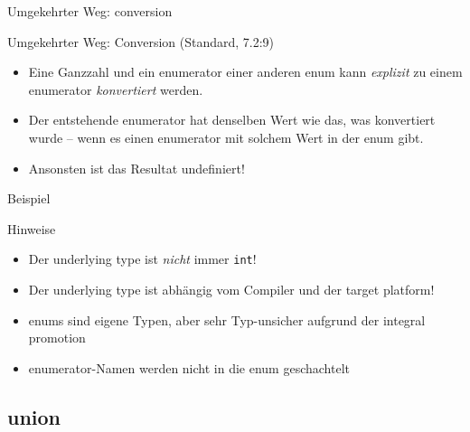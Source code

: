 \begin{frame}{Umgekehrter Weg: conversion}
	\begin{block}{Umgekehrter Weg: Conversion (Standard, 7.2:9)}
		\begin{itemize}[<+->]
			\item Eine Ganzzahl und ein enumerator einer anderen enum kann \emph{explizit} zu einem enumerator \emph{konvertiert} werden.
			\item Der entstehende enumerator hat denselben Wert wie das, was konvertiert wurde -- wenn es einen enumerator mit solchem Wert in der enum gibt.
			\item Ansonsten ist das Resultat \alert{undefiniert!}
		\end{itemize}
	\end{block}
	
	\uncover<+->
	{
		\begin{block}{Beispiel}
			\footnotesize
			
			
		\end{block}
	}
\end{frame}

\begin{frame}[fragile]{Hinweise}
	\begin{itemize}
		\item Der underlying type ist \emph{nicht} immer \verb|int|!
		\item Der underlying type ist abhängig vom Compiler und der target platform!
		\item enums sind eigene Typen, aber sehr Typ-unsicher aufgrund der integral promotion
		\item enumerator-Namen werden nicht in die enum geschachtelt
	\end{itemize}
\end{frame}



\subsection{union}

